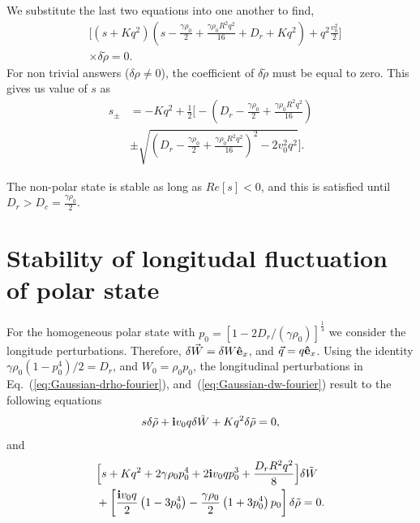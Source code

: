 \documentclass[reprint,floatfix,amsmath,amssymb,aps,pre,showkeys,showpacs,superscriptaddress]{revtex4-1}
\newcommand{\p}{p}
\newcommand{\e}{{\bf \hat{e}}}
\newcommand{\im}{{\rm \bf i}}
\newcommand{\w}{W}
\newcommand{\vw}{\vec{\w}}
\newcommand{\tw}{\tilde{\w}}
\newcommand{\reqs}[2]{Eq.~(\ref{#1}), and~(\ref{#2})}
\begin{document}
We substitute the last two equations into one another to find,
\begin{equation}
\begin{aligned}
&\Bigg[ \left( s + K q^2 \right) \left( s - \frac{\gamma \rho_0}{2} + \frac{\gamma \rho_0 R^2 q^2}{16} + D_r + K q^2 \right) + q^2 \frac{v_0^2}{2}  \Bigg] \\
&\times \delta \tilde{\rho} = 0.
\end{aligned}
\end{equation}
For non trivial answers ($\delta \rho \neq 0$), the coefficient of $\delta \tilde{\rho}$ must be equal to zero. This gives us value of $s$ as
\begin{equation}
\begin{aligned}
s_{\pm} &= - K q^2 + \frac{1}{2} \Bigg[ -\left( D_r - \frac{\gamma \rho_0}{2} + \frac{\gamma \rho_0 R^2 q^2}{16} \right) \\
&\pm \sqrt{\left( D_r - \frac{\gamma \rho_0}{2} + \frac{\gamma \rho_0 R^2 q^2}{16} \right)^2 - 2 v^2_0 q^2 } \Bigg].
\end{aligned}
\end{equation}

The non-polar state is stable as long as $Re[s] < 0$, and this is satisfied until $D_r > D_c = \frac{\gamma \rho_0}{2}$.


\section{Stability of longitudal fluctuation of polar state}
\label{ap:polar-stability}

For the homogeneous polar state with $\p_0 = [1 - 2 D_r / (\gamma \rho_0)]^\frac{1}{4}$ we consider the longitude perturbations. Therefore, $\delta \vw = \delta \w \e_x$, and $\vec{q}=q \e_x$. Using the identity $\gamma \rho_0 (1-\p_0^4)/2 = D_r$, and $\w_0 = \rho_0 \p_0$, the longitudinal perturbations in \reqs{eq:Gaussian-drho-fourier}{eq:Gaussian-dw-fourier} result to the following equations
\begin{equation}
s \delta \tilde{\rho} + \im v_0 q  \delta \tw + K q^2 \delta \tilde{\rho} = 0,
\end{equation}
and
\begin{equation}
\begin{aligned}
&\Big[ s + K q^2 + 2 \gamma \rho_0  \p_0^4 + 2 \im v_0 q \p_0^3 + \frac{D_r R^2 q^2}{8}  \Big] \delta \tw \\
&+ \left[ \frac{\im v_0 q}{2} \left( 1 - 3 \p_0^4 \right) - \frac{\gamma \rho_0}{2} \left( 1 + 3 \p_0^4 \right) \p_0  \right] \delta \tilde{\rho}  = 0.
\end{aligned}
\end{equation}
\end{document}
